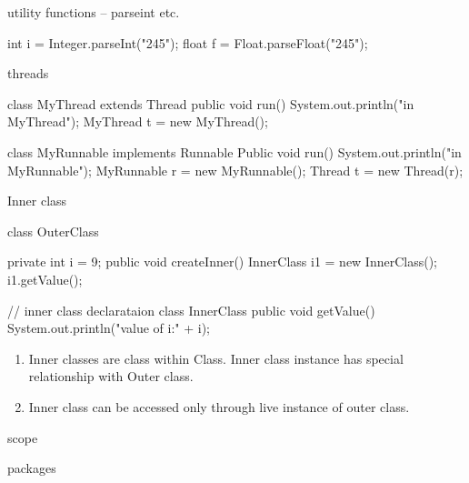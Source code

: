\documentclass[11pt]{beamer}
\begin{document}
\begin{frame}{utility functions -- parseint etc.}
\begin{java}
int i = Integer.parseInt("245");
float f = Float.parseFloat("245");
\end{java}

\end{frame}



\begin{frame}{threads}

\begin{java}
class MyThread extends Thread{
	public void run(){
		System.out.println("in MyThread");
	}
}
MyThread t = new MyThread();

class MyRunnable implements Runnable{
	Public void run(){
		System.out.println("in MyRunnable");
	}
}
MyRunnable r = new MyRunnable();
Thread t = new Thread(r);
\end{java}
\end{frame}



\begin{frame}{Inner class}
\begin{java}
class OuterClass {
	private int i = 9;
	public void createInner() {
		InnerClass i1 = new InnerClass();
		i1.getValue();
	}
	 
	// inner class declarataion
	class InnerClass {
		public void getValue(){
		System.out.println("value of i:" + i);
		}
	}
}


\end{java}

\begin{enumerate}
\item Inner classes are class within Class. Inner class instance has special relationship with Outer class.
\item Inner class can be accessed only through live instance of outer class.
\end{enumerate}
\end{frame}


\begin{frame}{scope}


\end{frame}


\begin{frame}{packages}

\end{frame}
\end{document}
